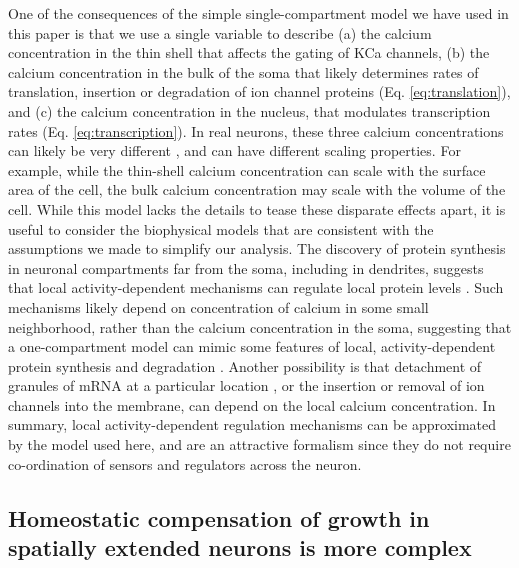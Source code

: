 \documentclass[9pt,lineno]{elife}
\begin{document}
One of the consequences of the simple single-compartment model we have used in this paper is that we use a single variable to describe (a) the calcium concentration in the thin shell that affects the gating of KCa channels, (b) the calcium concentration in the bulk  of the soma that likely determines rates of translation, insertion or degradation of ion channel proteins (Eq. \ref{eq:translation}), and (c) the calcium concentration in the nucleus, that modulates transcription rates (Eq. \ref{eq:transcription}). In real neurons, these three calcium concentrations can likely be very different \citep{Sala:1990hi, DeSchutter:1998tl}, and can have different scaling properties. For example, while the thin-shell calcium concentration can scale with the surface area of the cell, the bulk calcium concentration may scale with the volume of the cell. While this model lacks the details to tease these disparate effects apart, it is useful to consider the biophysical models that are consistent with the assumptions we made to simplify our analysis. The discovery of protein synthesis in neuronal compartments far from the soma, including in dendrites, suggests that local activity-dependent mechanisms can regulate local protein levels \citep{Steward:1982tx,Miller:2002wh,Sutton:2004fq}. Such mechanisms likely depend on concentration of calcium in some small neighborhood, rather than the calcium concentration in the soma, suggesting that a one-compartment model can mimic some features of local, activity-dependent protein synthesis and degradation \citep{Ouyang:1999ud}. Another possibility is that detachment of granules of mRNA at a particular location \citep{Doyle:2011be}, or the insertion or removal of ion channels into the membrane, can depend on the local calcium concentration. In summary, local activity-dependent regulation mechanisms can be approximated by the model used here, and are an attractive formalism since they do not require co-ordination of sensors and regulators across the neuron. 


\subsection{Homeostatic compensation of growth in spatially extended neurons is more complex}
\end{document}
